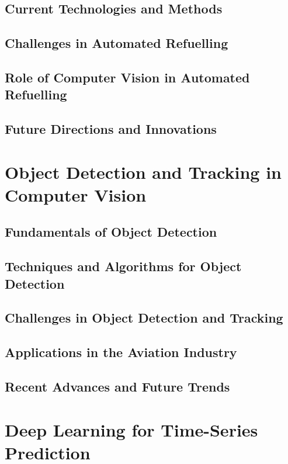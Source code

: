 \documentclass[12pt,oneside]{book} %
\begin{document}
\subsection{Current Technologies and Methods}

\subsection{Challenges in Automated Refuelling}

\subsection{Role of Computer Vision in Automated Refuelling}

\subsection{Future Directions and Innovations}

\newpage
\section{Object Detection and Tracking in Computer Vision}
\subsection{Fundamentals of Object Detection}

\subsection{Techniques and Algorithms for Object Detection}

\subsection{Challenges in Object Detection and Tracking}

\subsection{Applications in the Aviation Industry}

\subsection{Recent Advances and Future Trends}

\newpage
\section{Deep Learning for Time-Series Prediction}
\end{document}
